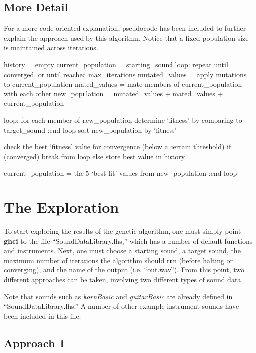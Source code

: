 \documentclass[11pt]{article}
\begin{document}
\subsection{More Detail}

For a more code-oriented explanation, pseudocode has been included to further explain the approach used by this algorithm. Notice that a fixed population size is maintained across iterations.

\begin{code}
history = empty
current_population = starting_sound
loop: repeat until converged, or until reached max_iterations
  mutated_values = apply mutations to current_population
  mated_values   = mate members of current_population with each other
  new_population = mutated_values + mated_values + current_population
  
  loop: for each member of new_population
    determine `fitness' by comparing to target_sound
  :end loop
  sort new_population by `fitness'
  
  check the best `fitness' value for convergence (below a certain threshold)
  if (converged)
    break from loop
  else
    store best value in history
  
  current_population = the 5 `best fit' values from new_population
:end loop
\end{code}
 
\section{The Exploration}

To start exploring the results of the genetic algorithm, one must simply point {\bf ghci} to the file ``SoundDataLibrary.lhs,'' which has a number of default functions and instruments. Next, one must choose a starting sound, a target sound, the maximum number of iterations the algorithm should run (before halting or converging), and the name of the output (i.e. ``out.wav''). 
From this point, two different approaches can be taken, involving two different types of sound data.

Note that sounds such as \emph{hornBasic} and \emph{guitarBasic} are already defined in ``SoundDataLibrary.lhs.'' A number of other example instrument sounds have been included in this file.

\subsection{Approach 1}
\end{document}
